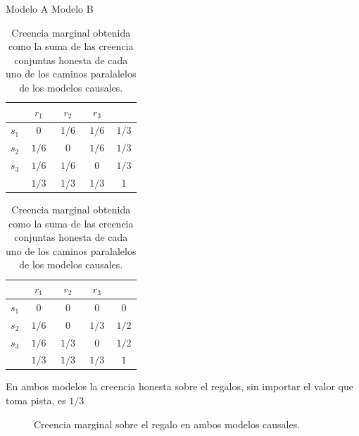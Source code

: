 \documentclass[a4paper,10pt]{book}
\theoremstyle{definition}
\begin{document}
\begin{table}[H]
\centering
Modelo A  \hspace{4.5cm}  Modelo B \\[0.1cm]
 \begin{tabular}{|c|c|c|c||c|} \hline \setlength\tabcolsep{0.4cm}
       & \, $r_1$ \, &  \, $r_2$ \, & \, $r_3$ \, & \\ \hline 
  $s_1$ & $0$ & $1/6$ & $1/6$ & $1/3$ \\ \hline
  $s_2$ & $1/6$ & $0$ & $1/6$ & $1/3$ \\ \hline
  $s_3$ & $1/6$ & $1/6$ & $0$ & $1/3$ \\ \hline \hline
   & $1/3$ & $1/3$ & $1/3$ & $1$ \\ \hline 
  \end{tabular}
  \hspace{1.5cm}
  \begin{tabular}{|c|c|c|c||c|} \hline  \setlength\tabcolsep{0.4cm} 
 & \, $r_1$ \, &  \, $r_2$ \, & \, $r_3$ \, & \\ \hline 
  $s_1$ & $0$ & $0$ & $0$ & $0$\\ \hline
  $s_2$ & $1/6$ & $0$ & $1/3$ & $1/2$ \\ \hline
  $s_3$ & $1/6$ & $1/3$ & $0$ & $1/2$ \\ \hline \hline
   & $1/3$ & $1/3$ & $1/3$ & $1$  \\ \hline
  \end{tabular}
  \caption{Creencia marginal obtenida como la suma de las creencia conjuntas honesta de cada uno de los caminos paralalelos de los modelos causales. }
  \label{tab:creencia_marginal}
\end{table}

En ambos modelos la creencia honesta sobre el regalos, sin importar el valor que toma pista, es $1/3$
\begin{figure}[H]
\centering
{} 
\caption{Creencia marginal sobre el regalo en ambos modelos causales. }
\end{figure}
\end{document}
